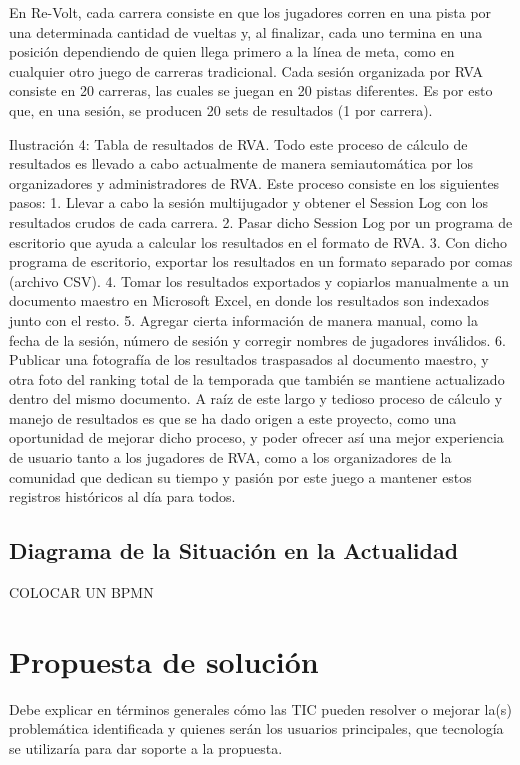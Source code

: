 En Re-Volt, cada carrera consiste en que los jugadores corren en una pista por una determinada cantidad de vueltas y, al finalizar, cada uno termina en una posición dependiendo de quien llega primero a la línea de meta, como en cualquier otro juego de carreras tradicional. Cada sesión organizada por RVA consiste en 20 carreras, las cuales se juegan en 20 pistas diferentes. Es por esto que, en una sesión, se producen 20 sets de resultados (1 por carrera).

Ilustración 4: Tabla de resultados de RVA.
Todo este proceso de cálculo de resultados es llevado a cabo actualmente de manera semiautomática por los organizadores y administradores de RVA. Este proceso consiste en los siguientes pasos:
1.	Llevar a cabo la sesión multijugador y obtener el Session Log con los resultados crudos de cada carrera.
2.	Pasar dicho Session Log por un programa de escritorio que ayuda a calcular los resultados en el formato de RVA.
3.	Con dicho programa de escritorio, exportar los resultados en un formato separado por comas (archivo CSV).
4.	Tomar los resultados exportados y copiarlos manualmente a un documento maestro en Microsoft Excel, en donde los resultados son indexados junto con el resto.
5.	Agregar cierta información de manera manual, como la fecha de la sesión, número de sesión y corregir nombres de jugadores inválidos.
6.	Publicar una fotografía de los resultados traspasados al documento maestro, y otra foto del ranking total de la temporada que también se mantiene actualizado dentro del mismo documento.
A raíz de este largo y tedioso proceso de cálculo y manejo de resultados es que se ha dado origen a este proyecto, como una oportunidad de mejorar dicho proceso, y poder ofrecer así una mejor experiencia de usuario tanto a los jugadores de RVA, como a los organizadores de la comunidad que dedican su tiempo y pasión por este juego a mantener estos registros históricos al día para todos.


\subsection{Diagrama de la Situación en la Actualidad}
COLOCAR UN BPMN

\section{Propuesta de solución}
Debe explicar en términos generales cómo las TIC pueden resolver o mejorar la(s) problemática identificada y quienes serán los usuarios principales, que tecnología se utilizaría para dar soporte a la propuesta.

